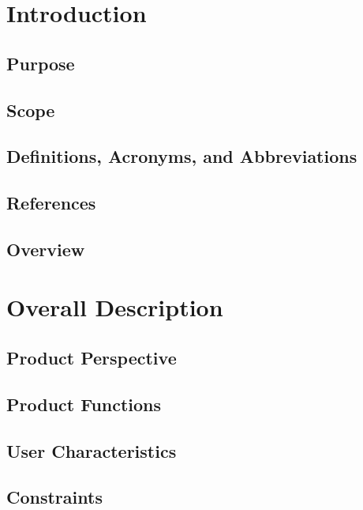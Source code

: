 \documentclass[onecolumn, draftclsnofoot,10pt, compsoc]{IEEEtran}
\begin{document}
	\section*{Introduction}

		\subsection*{Purpose}

		\subsection*{Scope}

		\subsection*{Definitions, Acronyms, and Abbreviations}

		\subsection*{References}


		\subsection*{Overview}


	\section*{Overall Description}
		\subsection*{Product Perspective}

		\subsection*{Product Functions}

		\subsection*{User Characteristics}

		\subsection*{Constraints}
\end{document}

